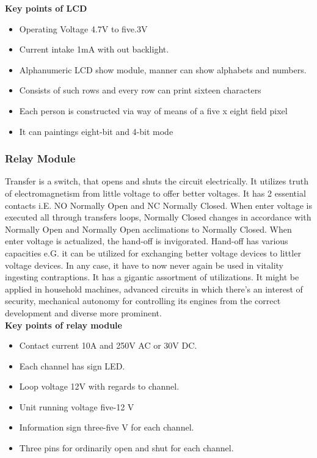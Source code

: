 \documentclass[12pt,a4paper]{article}
\begin{document}
\textbf{\large{Key points of LCD}}\\ 
\begin{itemize}
	\item Operating Voltage  4.7V to five.3V
	\item Current intake 1mA with out backlight.
	\item Alphanumeric LCD show module, manner can show alphabets and numbers.
	\item Consists of such rows and every row can print sixteen characters
	\item Each person is constructed via way of means of a five x eight field pixel
	\item It can paintings eight-bit and 4-bit mode
\end{itemize}

\subsubsection{Relay Module}
\hspace{0.5cm} Transfer is a switch, that opens and shuts the circuit electrically. It utilizes truth of electromagnetism from little voltage to offer better voltages. It has 2 essential contacts i.E. NO Normally Open and NC Normally Closed. When enter voltage is executed all through transfers loops, Normally Closed changes in accordance with Normally Open and Normally Open acclimations to Normally Closed. When enter voltage is actualized, the hand-off is invigorated. Hand-off has various capacities e.G. it can be utilized for exchanging better voltage devices to littler voltage devices. In any case, it have to now never again be used in vitality ingesting contraptions. It has a gigantic assortment of utilizations. It might be applied in household machines, advanced circuits in which there's an interest of security, mechanical autonomy for controlling its engines from the correct development and diverse more prominent.\\


\textbf{\large{Key points of relay module}}\\ 
\begin{itemize}

\item Contact current 10A and 250V AC or 30V DC. 
\item Each channel has sign LED. 
\item Loop voltage 12V with regards to channel. 
\item Unit running voltage five-12 V 
\item Information sign three-five V for each channel. 
\item Three pins for ordinarily open and shut for each channel.
	
\end{itemize}
\end{document}
